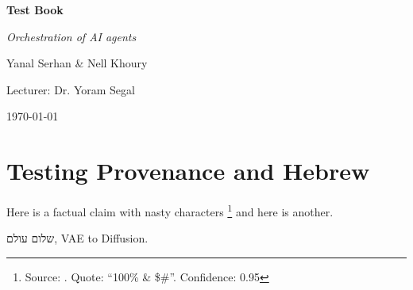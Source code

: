 \documentclass[a4paper,12pt,oneside]{memoir}
\begin{document}
\frontmatter

\begin{titlingpage}
    \centering
    \vspace*{2cm}
    
    {\Huge\bfseries\color{chaptercolor} Test Book \par}
    \vspace{0.5cm}
    {\LARGE\itshape Orchestration of AI agents\par}
    
    \vspace{2.5cm}
    
    {\Large Yanal Serhan \& Nell Khoury\par}
    \vspace{0.5cm}
    {\large Lecturer: Dr. Yoram Segal\par}
    
    \vfill
    
    {\large \today\par}
\end{titlingpage}

\begin{abstract}
\noindent Test abstract.
\end{abstract}

\clearpage
\tableofcontents
\clearpage
\listoffigures
\clearpage
\listoftables

\mainmatter


\chapter{Testing Provenance and Hebrew}
Here is a factual claim with nasty characters \footnote{Source: \protect\cite{ho2020}. Quote: ``100\% \& \$\#''. Confidence: 0.95} and here is another.
\begin{hebrew}
שלום עולם, VAE to Diffusion.
\end{hebrew}


\clearpage
{}
{}
\printbibliography
{}
\end{document}
